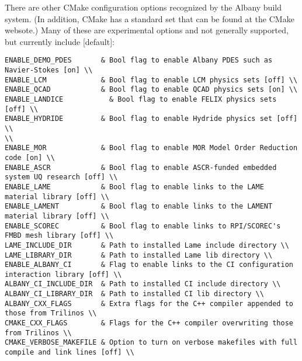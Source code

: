 \documentclass[pdf,12pt,report,strict]{SANDreport}
\theoremstyle{remark}
\begin{document}
There are other CMake configuration options recognized by the
Albany build system. (In addition, CMake has a standard set that
can be found at the CMake websote.) Many of these are experimental
options and not generally supported, but currently include [default]:
\begin{verbatim}
ENABLE_DEMO_PDES       & Bool flag to enable Albany PDES such as Navier-Stokes [on] \\
ENABLE_LCM             & Bool flag to enable LCM physics sets [off] \\
ENABLE_QCAD            & Bool flag to enable QCAD physics sets [on] \\
ENABLE_LANDICE           & Bool flag to enable FELIX physics sets [off] \\
ENABLE_HYDRIDE         & Bool flag to enable Hydride physics set [off] \\
\\
ENABLE_MOR             & Bool flag to enable MOR Model Order Reduction code [on] \\
ENABLE_ASCR            & Bool flag to enable ASCR-funded embedded system UQ research [off] \\
ENABLE_LAME            & Bool flag to enable links to the LAME material library [off] \\
ENABLE_LAMENT          & Bool flag to enable links to the LAMENT material library [off] \\
ENABLE_SCOREC          & Bool flag to enable links to RPI/SCOREC's FMBD mesh library [off] \\
LAME_INCLUDE_DIR       & Path to installed Lame include directory \\
LAME_LIBRARY_DIR       & Path to installed Lame lib directory \\
ENABLE_ALBANY_CI       & Flag to enable links to the CI configuration interaction library [off] \\
ALBANY_CI_INCLUDE_DIR  & Path to installed CI include directory \\
ALBANY_CI_LIBRARY_DIR  & Path to installed CI lib directory \\
ALBANY_CXX_FLAGS       & Extra flags for the C++ compiler appended to those from Trilinos \\
CMAKE_CXX_FLAGS        & Flags for the C++ compiler overwriting those from Trilinos \\
CMAKE_VERBOSE_MAKEFILE & Option to turn on verbose makefiles with full compile and link lines [off] \\
\end{verbatim}
\end{document}
